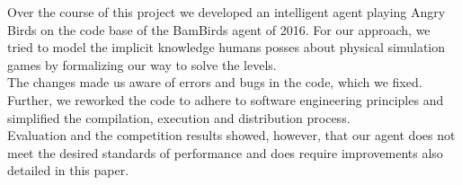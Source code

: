 Over the course of this project we developed an intelligent agent playing Angry Birds on the code base of the BamBirds agent of 2016. For our approach, we tried to model the implicit knowledge humans posses about physical simulation games by formalizing our way to solve the levels.\\
The changes made us aware of errors and bugs in the code, which we fixed. Further, we reworked the code to adhere to software engineering principles and simplified the compilation, execution and distribution process.\\
Evaluation and the competition results showed, however, that our agent does not meet the desired standards of performance and does require improvements also detailed in this paper.